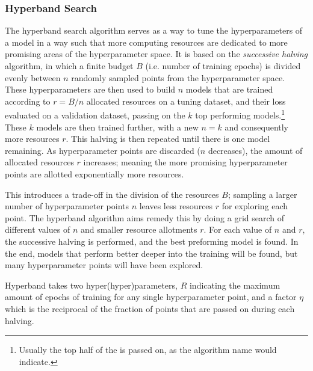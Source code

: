     \subsubsection{Hyperband Search}
        The hyperband search algorithm serves as a way to tune the hyperparameters of a model in a way such that more computing resources are dedicated to more promising areas of the hyperparameter space. It is based on the \textit{successive halving} algorithm, in which a finite budget $B$ (i.e. number of training epochs) is divided evenly between $n$ randomly sampled points from the hyperparameter space. These hyperparameters are then used to build $n$ models that are trained according to $r = B/n$ allocated resources on a tuning dataset, and their loss evaluated on a validation dataset, passing on the $k$ top performing models.\footnote{Usually the top half of the is passed on, as the algorithm name would indicate.} 
        These $k$ models are then trained further, with a new $n=k$ and consequently more resources $r$. This halving is then repeated until there is one model remaining. As hyperparameter points are discarded ($n$ decreases), the amount of allocated resources $r$ increases; meaning the more promising hyperparameter points are allotted exponentially more resources.

        This introduces a trade-off in the division of the resources $B$; sampling a larger number of hyperparameter points $n$ leaves less resources $r$ for exploring each point. The hyperband algorithm aims remedy this by doing a grid search of different values of $n$ and smaller resource allotments $r$. For each value of $n$ and $r$, the successive halving is performed, and the best preforming model is found. In the end, models that perform better deeper into the training will be found, but many hyperparameter points will have been explored.

        Hyperband takes two hyper(hyper)parameters, $R$ indicating the maximum amount of epochs of training for any single hyperparameter point, and a factor $\eta$ which is the reciprocal of the fraction of points that are passed on during each halving.



